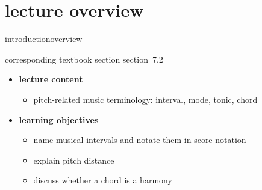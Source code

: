 


\subtitle{module 7.2: representation of pitch in music}


	

    \section[overview]{lecture overview}
        \begin{frame}{introduction}{overview}
            \begin{block}{corresponding textbook section}
                    section~7.2
            \end{block}

            \begin{itemize}
                \item   \textbf{lecture content}
                    \begin{itemize}
                        \item   pitch-related music terminology: interval, mode, tonic, chord
                    \end{itemize}
                \bigskip
                \item<2->   \textbf{learning objectives}
                    \begin{itemize}
                        \item   name musical intervals and notate them in score notation
                        \item   explain pitch distance
                        \item   discuss whether a chord is a harmony
                    \end{itemize}
            \end{itemize}
        \end{frame}

